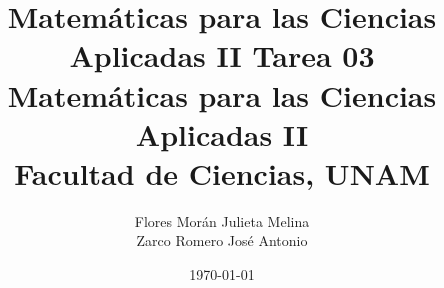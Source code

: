 \documentclass[12pt]{article}
\title{Matemáticas para las Ciencias Aplicadas II}
\title{
        \textbf{Tarea 03} \\
        \vspace{1ex}
        \large Matemáticas para las Ciencias Aplicadas II \\
        Facultad de Ciencias, UNAM}
\date{\today}
\author{Flores Morán Julieta Melina \\ Zarco Romero José Antonio}
\begin{document}
\maketitle

\section{}

\section{}

\section{}

\section{}

\section{}

\section{}

\section{}

\end{document}
